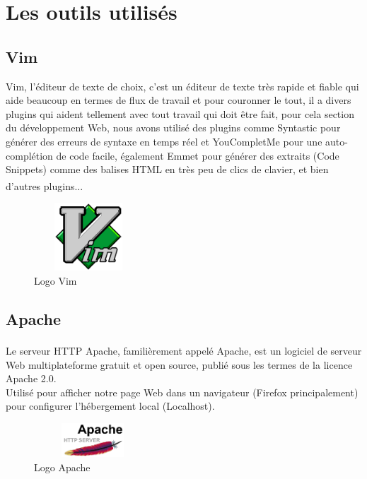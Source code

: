 \documentclass[12pt]{report}
\begin{document}
\vspace*{-0.3in}

\section{Les outils utilisés}

\subsection{Vim}

Vim, l'éditeur de texte de choix, c'est un éditeur de texte très rapide et fiable qui aide beaucoup en termes de flux de travail et pour couronner le tout, il a divers plugins qui aident tellement avec tout travail qui doit être fait, pour cela section du développement Web, nous avons utilisé des plugins comme Syntastic pour générer des erreurs de syntaxe en temps réel et YouCompletMe pour une auto-complétion de code facile, également Emmet pour générer des extraits (Code Snippets) comme des balises HTML en très peu de clics de clavier, et bien d'autres plugins...\textsuperscript{\cite{vim}\cite{schulz2007hacking}}

\begin{figure}[h]
\centering
    \includegraphics[width = 1.6in, height = 1in]{../Images/Vim.png}
\caption{Logo Vim}
\end{figure}

\vspace{-0.42in}

\subsection{Apache}

Le serveur HTTP Apache\textsuperscript{\cite{hadoop}}, familièrement appelé Apache, est un logiciel de serveur Web multiplateforme gratuit et open source, publié sous les termes de la licence Apache 2.0.
\\
Utilisé pour afficher notre page Web dans un navigateur (Firefox principalement) pour configurer l'hébergement local (Localhost).

\begin{figure}[h]
\centering
    \includegraphics[width = 1.73in, height = 0.5in]{../Images/Apache.png}
\caption{Logo Apache}
\vspace{-0.3in}
\end{figure}
\end{document}
